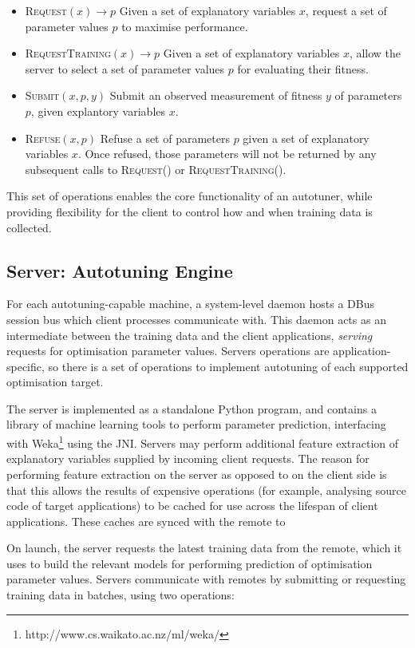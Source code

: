 \begin{itemize}
\item \textsc{Request}$(x) \to p$ Given a set of explanatory variables
  $x$, request a set of parameter values $p$ to maximise performance.
\item \textsc{RequestTraining}$(x) \to p$ Given a set of explanatory
  variables $x$, allow the server to select a set of parameter values
  $p$ for evaluating their fitness.
\item \textsc{Submit}$(x, p, y)$ Submit an observed measurement of
  fitness $y$ of parameters $p$, given explantory variables $x$.
\item \textsc{Refuse}$(x, p)$ Refuse a set of parameters $p$ given a
  set of explanatory variables $x$. Once refused, those parameters
  will not be returned by any subsequent calls to \textsc{Request()}
  or \textsc{RequestTraining()}.
\end{itemize}

This set of operations enables the core functionality of an autotuner,
while providing flexibility for the client to control how and when
training data is collected.


\subsection{Server: Autotuning Engine}

For each autotuning-capable machine, a system-level daemon hosts a
DBus session bus which client processes communicate with. This daemon
acts as an intermediate between the training data and the client
applications, \emph{serving} requests for optimisation parameter
values. Servers operations are application-specific, so there is a set
of operations to implement autotuning of each supported optimisation
target.

The server is implemented as a standalone Python program, and contains
a library of machine learning tools to perform parameter prediction,
interfacing with Weka\footnote{http://www.cs.waikato.ac.nz/ml/weka/}
using the JNI. Servers may perform additional feature extraction of
explanatory variables supplied by incoming client requests. The reason
for performing feature extraction on the server as opposed to on the
client side is that this allows the results of expensive operations
(for example, analysing source code of target applications) to be
cached for use across the lifespan of client applications. These
caches are synced with the remote to

On launch, the server requests the latest training data from the
remote, which it uses to build the relevant models for performing
prediction of optimisation parameter values. Servers communicate with
remotes by submitting or requesting training data in batches, using
two operations:

